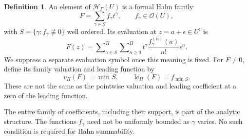 \documentclass[11pt,a4paper]{article}
\theoremstyle{definition}
\newtheorem{definition}[theorem]{Definition}
\theoremstyle{remark}
\newcommand{\OO}{\mathcal O}
\newcommand{\HH}{\mathcal H}
\newcommand{\LC}{\operatorname{lc}}
\newcommand{\Hs}{\mathop{\sum}\nolimits^{\!H}}
\begin{document}
\begin{definition}\label{def:H}
An element of $\HH_\Gamma(U)$ is a formal Hahn family
\[
 F=\sum_{\gamma\in S} f_\gamma t^\gamma,
 \qquad f_\gamma\in\OO(U),
\]
with $S=\{\gamma:f_\gamma\not\equiv0\}$ well ordered. Its evaluation
at $z=a+\epsilon\in U^\sharp$ is
\begin{equation}\label{eq:Heval}
 F(z)=\Hs_{\gamma\in S}\Hs_{n\ge0}
 t^\gamma\frac{f_\gamma^{(n)}(a)}{n!}\epsilon^n.
\end{equation}
We suppress a separate evaluation symbol once this meaning is fixed.
For $F\ne0$, define its family valuation and leading function by
\[
 v_H(F)=\min S,\qquad \LC_H(F)=f_{\min S}.
\]
These are not the same as the pointwise valuation and leading
coefficient at a zero of the leading function.
\end{definition}
The entire family of coefficients, including their support, is part of
the analytic structure. The functions $f_\gamma$ need not be uniformly
bounded as $\gamma$ varies. No such condition is required for Hahn
summability.
\end{document}
